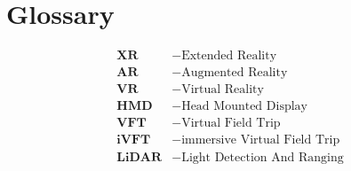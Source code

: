 \chapter*{Glossary}
\begin{align*}
    \textbf{XR} &- \text{Extended Reality} \\
    \textbf{AR} &- \text{Augmented Reality} \\
    \textbf{VR} &- \text{Virtual Reality} \\
    \textbf{HMD} &- \text{Head Mounted Display} \\
    \textbf{VFT} &- \text{Virtual Field Trip} \\
    \textbf{iVFT} &- \text{immersive Virtual Field Trip} \\
    \textbf{LiDAR} &- \text{Light Detection And Ranging} \\
\end{align*}

